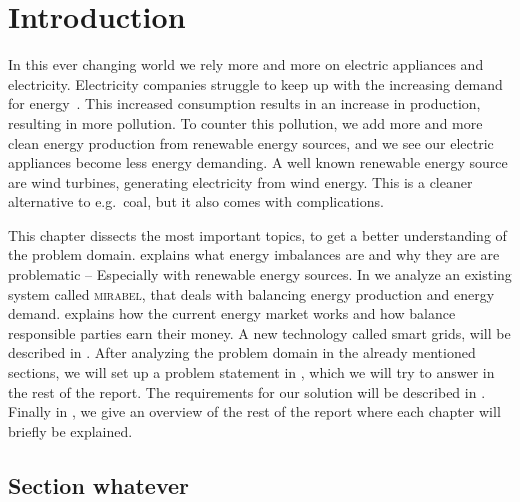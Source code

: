 \chapter{Introduction}\label{chap:introduction}
In this ever changing world we rely more and more on electric appliances and electricity. Electricity companies struggle to keep up with the increasing demand for energy~\cite{ieoOutlook}. This increased consumption results in an increase in production, resulting in more pollution. To counter this pollution, we add more and more clean energy production from renewable energy sources, and we see our electric appliances become less energy demanding. A well known renewable energy source are wind turbines, generating electricity from wind energy. This is a cleaner alternative to e.g.\ coal, but it also comes with complications. 

This chapter dissects the most important topics, to get a better understanding of the problem domain.  explains what energy imbalances are and why they are are problematic -- Especially with renewable energy sources. In  we analyze an existing system called \textsc{mirabel}, that deals with balancing energy production and energy demand.  explains how the current energy market works and how balance responsible parties earn their money. A new technology called smart grids, will be described in . After analyzing the problem domain in the already mentioned sections, we will set up a problem statement in , which we will try to answer in the rest of the report. The requirements for our solution will be described in . Finally in , we give an overview of the rest of the report where each chapter will briefly be explained. 

\section{Section whatever}

\lipsum
